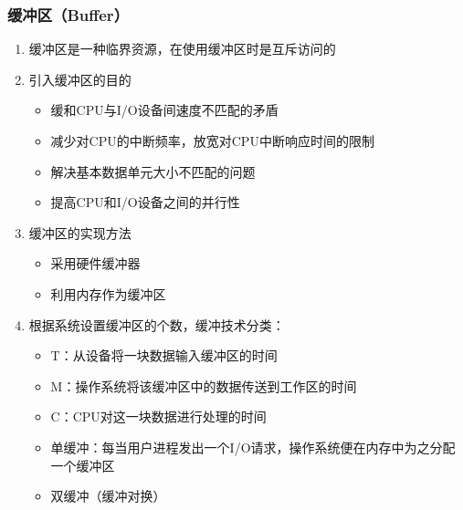 \documentclass[./computer-organization-and-architecture.tex]{subfiles}
\begin{document}
    \subsubsection{缓冲区（Buffer）}

    \begin{enumerate}
        \item 缓冲区是一种临界资源，在使用缓冲区时是互斥访问的
        \item 引入缓冲区的目的
        \begin{itemize}
            \item 缓和CPU与I/O设备间速度不匹配的矛盾
            \item 减少对CPU的中断频率，放宽对CPU中断响应时间的限制
            \item 解决基本数据单元大小不匹配的问题
            \item 提高CPU和I/O设备之间的并行性
        \end{itemize}
        \item 缓冲区的实现方法
        \begin{itemize}
            \item 采用硬件缓冲器
            \item 利用内存作为缓冲区
        \end{itemize}
        \item 根据系统设置缓冲区的个数，缓冲技术分类：
        \begin{itemize}
            \item T：从设备将一块数据输入缓冲区的时间
            \item M：操作系统将该缓冲区中的数据传送到工作区的时间
            \item C：CPU对这一块数据进行处理的时间
            \item 单缓冲：每当用户进程发出一个I/O请求，操作系统便在内存中为之分配一个缓冲区
            \item 双缓冲（缓冲对换）

\end{itemize}
\end{enumerate}
\end{document}
